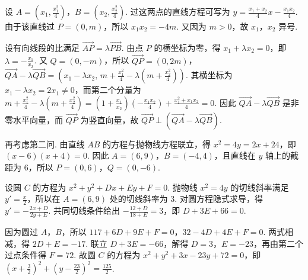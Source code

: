 \begin{solution}
设 \(A=\left(x_1,\frac{x_1^2}{4}\right)\)，\(B=\left(x_2,\frac{x_2^2}{4}\right)\). 过这两点的直线方程可写为
\(\displaystyle y=\frac{x_1+x_2}{4}x-\frac{x_1x_2}{4}\).
由于该直线过 \(P=(0,m)\)，所以 \(x_1x_2=-4m\). 又因为 \(m>0\)，故 \(x_1\)，\(x_2\) 异号.

设有向线段的比满足 \(\overrightarrow{AP}=\lambda\overrightarrow{PB}\). 由点 \(P\) 的横坐标为零，得 \(x_1+\lambda x_2=0\)，即 \(\lambda=-\frac{x_1}{x_2}\). 又 \(Q=(0,-m)\)，所以
\(\overrightarrow{QP}=(0,2m)\)，
\(\overrightarrow{QA}-\lambda\overrightarrow{QB}=\left(x_1-\lambda x_2,\,m+\frac{x_1^2}{4}-\lambda\left(m+\frac{x_2^2}{4}\right)\right)\).
其横坐标为 \(x_1-\lambda x_2=2x_1\ne0\)，而第二个分量为
\(\displaystyle m+\frac{x_1^2}{4}-\lambda\left(m+\frac{x_2^2}{4}\right)=\left(1+\frac{x_1}{x_2}\right)\left(-\frac{x_1x_2}{4}\right)+\frac{x_1^2+x_1x_2}{4}=0\).
因此 \(\overrightarrow{QA}-\lambda\overrightarrow{QB}\) 是非零水平向量，而 \(\overrightarrow{QP}\) 为竖直向量，故 \(\overrightarrow{QP}\perp(\overrightarrow{QA}-\lambda\overrightarrow{QB})\).

再考虑第二问. 由直线 \(AB\) 的方程与抛物线方程联立，得
\(\displaystyle x^2=4y=2x+24\)，即 \((x-6)(x+4)=0\). 因此 \(A=(6,9)\)，\(B=(-4,4)\)，且直线在 \(y\) 轴上的截距为 \(6\)，所以 \(P=(0,6)\)，\(Q=(0,-6)\).

设圆 \(C\) 的方程为 \(x^2+y^2+Dx+Ey+F=0\). 抛物线 \(x^2=4y\) 的切线斜率满足 \(y'=\frac{x}{2}\)，所以在 \(A=(6,9)\) 处的切线斜率为 \(3\). 对圆方程隐式求导，得
\(\displaystyle y'=-\frac{2x+D}{2y+E}\).
共同切线条件给出 \(\displaystyle-\frac{12+D}{18+E}=3\)，即 \(D+3E+66=0\).

因为圆过 \(A\)，\(B\)，所以
\(117+6D+9E+F=0\)，\(32-4D+4E+F=0\).
两式相减，得 \(2D+E=-17\). 联立 \(D+3E=-66\)，解得 \(D=3\)，\(E=-23\)，再由第二个过点条件得 \(F=72\). 故圆 \(C\) 的方程为
\(x^2+y^2+3x-23y+72=0\)，即
\(\displaystyle\left(x+\frac{3}{2}\right)^2+\left(y-\frac{23}{2}\right)^2=\frac{125}{2}\).
\end{solution}

